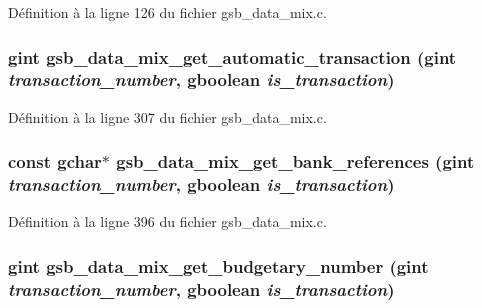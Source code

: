Définition à la ligne 126 du fichier gsb\_\-data\_\-mix.c.

\subsubsection[{gsb\_\-data\_\-mix\_\-get\_\-automatic\_\-transaction}]{\setlength{\rightskip}{0pt plus 5cm}gint gsb\_\-data\_\-mix\_\-get\_\-automatic\_\-transaction (gint {\em transaction\_\-number}, \/  gboolean {\em is\_\-transaction})}\label{gsb__data__mix_8h_a985bfc0d8565c8ebd4977e4f9b1fae48}


Définition à la ligne 307 du fichier gsb\_\-data\_\-mix.c.

\subsubsection[{gsb\_\-data\_\-mix\_\-get\_\-bank\_\-references}]{\setlength{\rightskip}{0pt plus 5cm}const gchar$\ast$ gsb\_\-data\_\-mix\_\-get\_\-bank\_\-references (gint {\em transaction\_\-number}, \/  gboolean {\em is\_\-transaction})}\label{gsb__data__mix_8h_ad691b36a183805222a9894da611728e4}


Définition à la ligne 396 du fichier gsb\_\-data\_\-mix.c.

\subsubsection[{gsb\_\-data\_\-mix\_\-get\_\-budgetary\_\-number}]{\setlength{\rightskip}{0pt plus 5cm}gint gsb\_\-data\_\-mix\_\-get\_\-budgetary\_\-number (gint {\em transaction\_\-number}, \/  gboolean {\em is\_\-transaction})}\label{gsb__data__mix_8h_a45830c30d41b2587fa29718ed7e4dd00}


